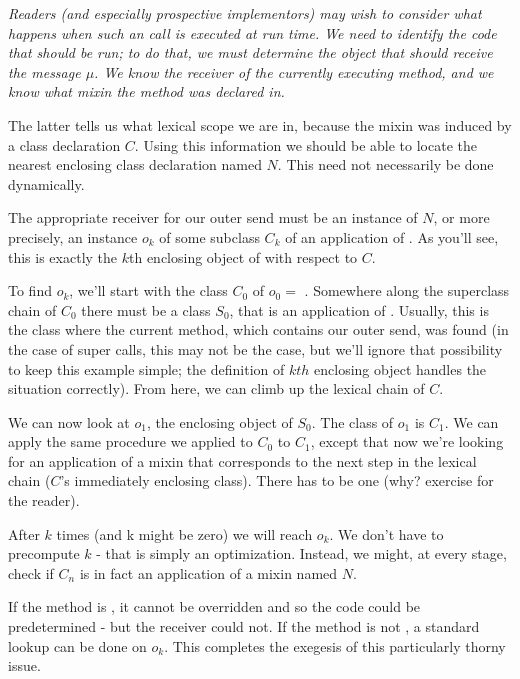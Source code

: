 \documentclass{article}
\begin{document}
{\it
Readers (and especially prospective implementors) may wish to consider what happens when such an \OUTER{} call is executed at run time.  We need to identify the code that should be run; to do that, we must determine the object that should receive the message $\mu$. We know the receiver of the currently executing method, and we know what mixin the method was declared in. 

The latter tells us what lexical scope we are in, because the mixin was induced by a class declaration $C$. Using this information we should be able to locate the nearest enclosing class declaration named $N$. This need not necessarily be done dynamically.

The appropriate receiver for our outer send  must be an instance of $N$, or more precisely, an instance $o_k$ of some subclass $C_k$ of an application of . As you'll see, this is exactly the $k$th enclosing object of \SELF{}  with respect to $C$.

To find $o_k$, we'll start with the class $C_0$ of $o_0 = $ \SELF{}. Somewhere along the superclass chain of $C_0$  there must be a class $S_0$, that is an application of .  Usually, this is the class where the current method, which contains our outer send, was found (in the case of super calls, this may not be the case, but we'll ignore that possibility to keep this example simple; the definition of $kth$ enclosing object handles the situation correctly). From here, we can climb up the lexical chain of $C$.


We can now look at $o_1$, the enclosing object of $S_0$. The class of $o_1$ is $C_1$. We can apply the same procedure we applied to $C_0$ to $C_1$, except that now we're looking for an application of a mixin that corresponds to the next step in the lexical chain ($C$'s immediately enclosing class). There has to be one (why? exercise for the reader).

After $k$ times (and k might be zero) we will reach $o_k$. We don't have to precompute $k$ - that is simply an optimization. Instead, we might, at every stage, check if $C_n$ is in fact an application of a mixin named $N$.

If the method is \PRIVATE{},
it cannot be overridden and so the code could be predetermined - but the receiver could not. If the method is not \PRIVATE, a standard lookup can be done on $o_k$.  This completes the exegesis of this particularly thorny issue.
}
\end{document}
